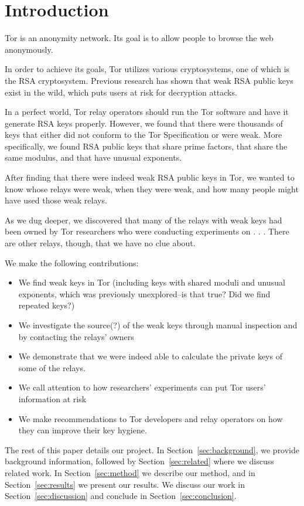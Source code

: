 \section{Introduction}
Tor is an anonymity network.  Its goal is to allow people to browse 
the web anonymously.

In order to achieve its goals, Tor utilizes various cryptosystems, 
one of which is the RSA cryptosystem.  Previous research has 
shown that weak RSA public keys exist in the wild, which puts users at 
risk for decryption attacks.  

In a perfect world, Tor relay operators should run the Tor software and have it 
generate RSA keys properly. However, we found that there were thousands of keys 
that either did not conform to the Tor Specification or were weak.  More 
specifically, we found RSA public keys that share prime factors, 
that share the same modulus, and that have unusual exponents.

After finding that there were indeed weak RSA public keys in Tor, we wanted 
to know whose relays were weak, when they were weak, and how many people might 
have used those weak relays.

As we dug deeper, we discovered that many of the relays with weak keys had been owned 
by Tor researchers who were conducting experiments on . . . There are other 
relays, though, that we have no clue about.

We make the following contributions:
\begin{itemize}
  \item We find weak keys in Tor (including keys with shared moduli 
    and unusual exponents, which was previously unexplored--is that true?
    Did we find repeated keys?)
  \item We investigate the source(?) of the weak keys through manual inspection and by 
    contacting the relays' owners
  \item We demonstrate that we were indeed able to calculate the private keys of 
    some of the relays.
  \item We call attention to how researchers' experiments can put Tor users'
    information at risk
  \item We make recommendations to Tor developers and relay operators on how they can 
    improve their key hygiene.
\end{itemize}

The rest of this paper details our project.  In Section~\ref{sec:background}, we
provide background information, followed by Section~\ref{sec:related} where we 
discuss related work.  In Section~\ref{sec:method} we describe our method,
and in Section~\ref{sec:results} we present our results.  We discuss our work in
Section~\ref{sec:discussion} and conclude in Section~\ref{sec:conclusion}.

